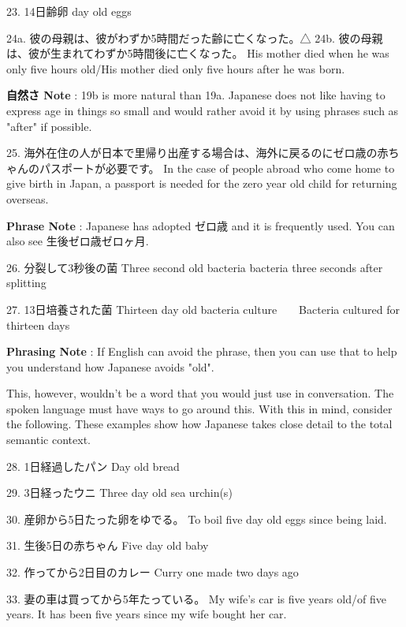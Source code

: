 \par{23. 14日齢卵 \hfill{} day old eggs }

\par{24a. 彼の母親は、彼がわずか5時間だった齢に亡くなった。△ \hfill\break
24b. 彼の母親は、彼が生まれてわずか5時間後に亡くなった。 \hfill\break
His mother died when he was only five hours old\slash His mother died only five hours after he was born. }

\par{\textbf{自然さ Note }: 19b is more natural than 19a. Japanese does not like having to express age in things so small and would rather avoid it by using phrases such as "after" if possible. }

\par{25. 海外在住の人が日本で里帰り出産する場合は、海外に戻るのにゼロ歳の赤ちゃんのパスポートが必要です。 \hfill\break
In the case of people abroad who come home to give birth in Japan, a passport is needed for the zero year old child for returning overseas.  }

\par{\textbf{Phrase Note }: Japanese has adopted ゼロ歳 and it is frequently used. You can also see 生後ゼロ歳ゼロヶ月. }

\par{26. 分裂して3秒後の菌 \hfill\break
Three second old bacteria \textrightarrow  bacteria three seconds after splitting }

\par{27. 13日培養された菌 \hfill\break
Thirteen day old bacteria culture　\textrightarrow 　Bacteria cultured for thirteen days }

\par{\textbf{Phrasing Note }: If English can avoid the phrase, then you can use that to help you understand how Japanese avoids "old". }

\par{ This, however, wouldn't be a word that you would just use in conversation. The spoken language must have ways to go around this. With this in mind, consider the following. These examples show how Japanese takes close detail to the total semantic context. }

\par{28. 1日経過したパン \hfill\break
Day old bread }

\par{29. 3日経ったウニ \hfill\break
Three day old sea urchin(s) }

\par{30. 産卵から5日たった卵をゆでる。 \hfill\break
To boil five day old eggs since being laid. }

\par{31. 生後5日の赤ちゃん \hfill\break
Five day old baby }

\par{32. 作ってから2日目のカレー \hfill\break
Curry one made two days ago }

\par{33. 妻の車は買ってから5年たっている。 \hfill\break
My wife's car is five years old\slash of five years. \textrightarrow  It has been five years since my wife bought her car. }
    
